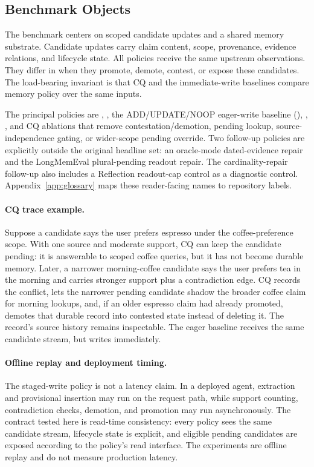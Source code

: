 \subsection{Benchmark Objects}

The benchmark centers on scoped candidate updates and a shared memory
substrate. Candidate updates carry claim content, scope, provenance, evidence
relations, and lifecycle state. All policies receive the same upstream
observations. They differ in when they promote, demote, contest, or expose
these candidates. The load-bearing invariant is that CQ and the immediate-write
baselines compare memory policy over the same inputs.

The principal policies are \cq{}, , the ADD/UPDATE/NOOP
eager-write baseline
(\memzero{}),
,
, and CQ ablations that remove
contestation/demotion, pending lookup, source-independence gating, or
wider-scope pending override.
Two follow-up policies are explicitly outside the original headline set: an
oracle-mode dated-evidence repair and the LongMemEval plural-pending readout
repair. The cardinality-repair follow-up also includes a Reflection readout-cap
control as a diagnostic control. Appendix~\ref{app:glossary} maps these
reader-facing names to repository labels.



\paragraph{CQ trace example.}
Suppose a candidate says the user prefers espresso under the coffee-preference
scope. With one source and moderate support, CQ can keep the candidate pending:
it is answerable to scoped coffee queries, but it has not become durable memory.
Later, a narrower morning-coffee candidate says the user prefers tea in the
morning and carries stronger support plus a contradiction edge. CQ records the
conflict, lets the narrower pending candidate shadow the broader coffee claim
for morning lookups, and, if an older espresso claim had already promoted,
demotes that durable record into contested state instead of deleting it. The
record's source history remains inspectable. The eager baseline receives the
same candidate stream, but writes immediately.

\paragraph{Offline replay and deployment timing.}
The staged-write policy is not a latency claim. In a deployed agent, extraction
and provisional insertion may run on the request path, while support counting,
contradiction checks, demotion, and promotion may run asynchronously. The
contract tested here is read-time consistency: every policy sees the same
candidate stream, lifecycle state is explicit, and eligible pending candidates
are exposed according to the policy's read interface. The experiments are
offline replay and do not measure production latency.

